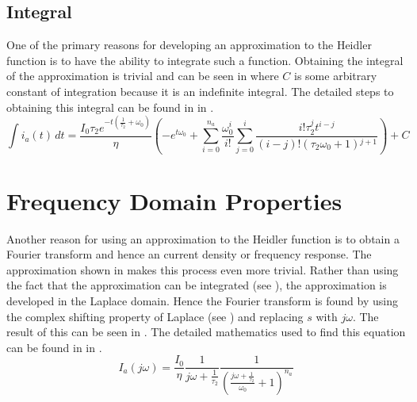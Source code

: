 \subsection{Integral}
One of the primary reasons for developing an approximation to the Heidler function is to have the ability to integrate such a function. Obtaining the integral of the approximation is trivial and can be seen in  where $C$ is some arbitrary constant of integration because it is an indefinite integral. The detailed steps to obtaining this integral can be found in  in .
\label{sub:approx_integral}
\begin{equation}
    \int i_a \left( t \right) \, dt = \frac{I_0 \tau _2 e^{-t \left(\frac{1}{\tau _2}+\omega _0\right)}}{\eta } \left(-e^{t \omega _0} + \sum _{i=0}^{n_a} \frac{\omega _0^i}{i!} \sum _{j=0}^i \frac{i! \tau _2^j t^{i-j}}{(i-j)! \left(\tau _2 \omega _0+1\right){}^{j+1}}\right) + C
    \label{eqn:approxInt}
\end{equation}


\section{Frequency Domain Properties}
\label{sec:approx_frequency_domain_analysis}
Another reason for using an approximation to the Heidler function is to obtain a Fourier transform and hence an current density or frequency response. The approximation shown in  makes this process even more trivial. Rather than using the fact that the approximation can be integrated (see ), the approximation is developed in the Laplace domain. Hence the Fourier transform is found by using the complex shifting property of Laplace (see ) and replacing $s$ with $j\omega$. The result of this can be seen in . The detailed mathematics used to find this equation can be found in  in .
\begin{equation}
    I_a \left( j\omega \right) = \frac{I_0}{\eta}\frac{1}{j\omega + \frac{1}{\tau_2}}\frac{1}{\left ( \frac{j\omega + \frac{1}{\tau_2}}{\omega_0} + 1 \right )^{n_a}}
    \label{eqn:approx_fourier}
\end{equation}

